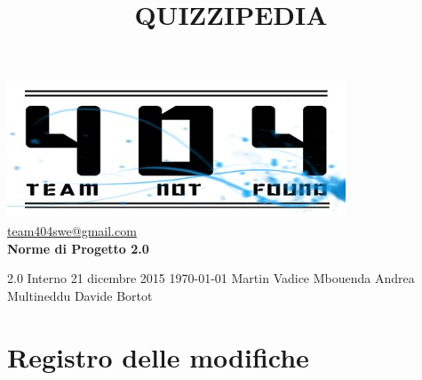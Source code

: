 \documentclass[a4paper,11pt]{article}
\title{\textbf{{\fontsize{8mm}{5mm}\selectfont QUIZZIPEDIA}}}
\date{}
\author{}
\begin{document}
	\maketitle
	\thispagestyle{empty}
	\begin{center}
	\includegraphics{../../team_not_found.jpg}\\
	\fontsize{5mm}{3mm}\url{team404swe@gmail.com}\\
	
	\vspace{50mm}
	\textbf{Norme di Progetto 2.0}	
	\end{center}
	
			{2.0} 							%
			{Interno} 						%
			{21 dicembre 2015} 				%
			{\today} 						%
			{Martin Vadice Mbouenda}		%
			{Andrea Multineddu} 			%
			{Davide Bortot} 				%
	\newpage
	\null
	\thispagestyle{empty}
	
	\newpage	
	\newpage
	\fancyfoot[R]{\thepage}
	
	\hspace{30 mm}
	\section*{Registro delle modifiche}
		\beginregistro
		
			
\end{document}
